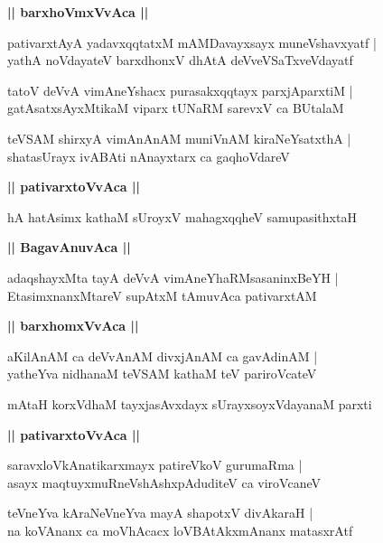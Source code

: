 \documentclass[twoside,12pt,openright]{book}
\newcounter{shloka}[chapter]
\def\uvaca#1{\centerline{{\large\textbf{#1}}}}
\begin{document}
\uvaca{|| barxhoVmxVvAca ||}

\begin{shloka}%
pativarxtAyA yadavxqqtatxM mAMDavayxsayx muneVshavxyatf |\\
yathA noVdayateV barxdhonxV dhAtA deVveVSaTxveVdayatf 
\end{shloka}

\begin{shloka}%
tatoV deVvA vimAneYshacx purasakxqqtayx parxjAparxtiM |\\
gatAsatxsAyxMtikaM viparx tUNaRM sarevxV ca BUtalaM 
\end{shloka}

\begin{shloka}%
teVSAM shirxyA vimAnAnAM muniVnAM kiraNeYsatxthA |\\
shatasUrayx ivABAti nAnayxtarx ca gaqhoVdareV 
\end{shloka}

\uvaca{|| pativarxtoVvAca ||}

\begin{shloka}%
hA hatAsimx kathaM sUroyxV mahagxqqheV samupasithxtaH 
\end{shloka}

\uvaca{|| BagavAnuvAca ||}

\begin{shloka}%
adaqshayxMta tayA deVvA vimAneYhaRMsasaninxBeYH |\\
EtasimxnanxMtareV supAtxM tAmuvAca pativarxtAM 
\end{shloka}

\uvaca{|| barxhomxVvAca ||}

\begin{shloka}%
aKilAnAM ca deVvAnAM divxjAnAM ca gavAdinAM |\\
yatheYva nidhanaM teVSAM kathaM teV pariroVcateV 
\end{shloka}

\begin{shloka}%
mAtaH korxVdhaM tayxjasAvxdayx sUrayxsoyxVdayanaM parxti 
\end{shloka}

\uvaca{|| pativarxtoVvAca ||}

\begin{shloka}%
saravxloVkAnatikarxmayx patireVkoV gurumaRma |\\
asayx maqtuyxmuRneVshAshxpAduditeV ca viroVcaneV 
\end{shloka}

\begin{shloka}%
teVneYva kAraNeVneYva mayA shapotxV divAkaraH |\\
na koVAnanx ca moVhAcacx loVBAtAkxmAnanx matasxrAtf 
\end{shloka}
\end{document}
